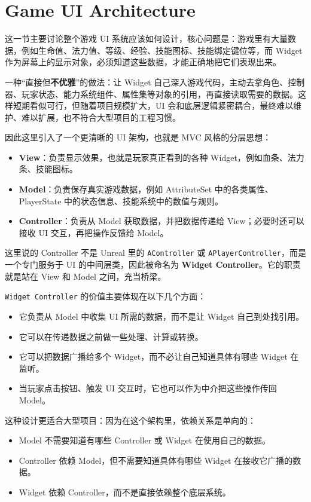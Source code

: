 \section{Game UI Architecture}

这一节主要讨论整个游戏 UI 系统应该如何设计，核心问题是：游戏里有大量数据，例如生命值、法力值、等级、经验、技能图标、技能绑定键位等，而 Widget 作为屏幕上的显示对象，必须知道这些数据，才能正确地把它们表现出来。

一种“直接但\textbf{不优雅}”的做法：让 Widget 自己深入游戏代码，主动去拿角色、控制器、玩家状态、能力系统组件、属性集等对象的引用，再直接读取需要的数据。这样短期看似可行，但随着项目规模扩大，UI 会和底层逻辑紧密耦合，最终难以维护、难以扩展，也不符合大型项目的工程习惯。

因此这里引入了一个更清晰的 UI 架构，也就是 MVC 风格的分层思想：
\begin{itemize}
	\item \textbf{View}：负责显示效果，也就是玩家真正看到的各种 Widget，例如血条、法力条、技能图标。
	\item \textbf{Model}：负责保存真实游戏数据，例如 AttributeSet 中的各类属性、PlayerState 中的状态信息、技能系统中的数值与规则。
	\item \textbf{Controller}：负责从 Model 获取数据，并把数据传递给 View；必要时还可以接收 UI 交互，再把操作反馈给 Model。
\end{itemize}

这里说的 Controller 不是 Unreal 里的 \texttt{AController} 或 \texttt{APlayerController}，而是一个专门服务于 UI 的中间层类，因此被命名为 \textbf{Widget Controller}。它的职责就是站在 View 和 Model 之间，充当桥梁。

\texttt{Widget Controller} 的价值主要体现在以下几个方面：
\begin{itemize}
	\item 它负责从 Model 中收集 UI 所需的数据，而不是让 Widget 自己到处找引用。
	\item 它可以在传递数据之前做一些处理、计算或转换。
	\item 它可以把数据广播给多个 Widget，而不必让自己知道具体有哪些 Widget 在监听。
	\item 当玩家点击按钮、触发 UI 交互时，它也可以作为中介把这些操作传回 Model。
\end{itemize}

这种设计更适合大型项目：因为在这个架构里，依赖关系是单向的：
\begin{itemize}
	\item Model 不需要知道有哪些 Controller 或 Widget 在使用自己的数据。
	\item Controller 依赖 Model，但不需要知道具体有哪些 Widget 在接收它广播的数据。
	\item Widget 依赖 Controller，而不是直接依赖整个底层系统。
\end{itemize}


